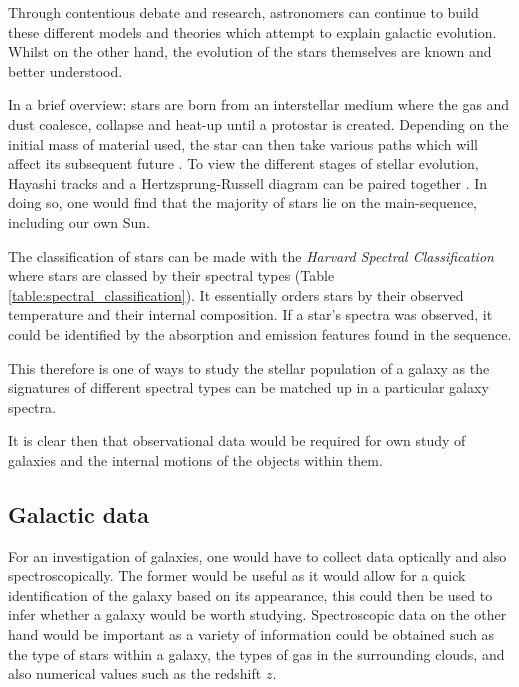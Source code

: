 \documentclass[12pt, twocolumn]{revtex4-1}    %
\begin{document}
Through contentious debate and research, astronomers can continue to build these different models and theories which attempt to explain galactic evolution. Whilst on the other hand, the evolution of the stars themselves are known and better understood. 

In a brief overview: stars are born from an interstellar medium where the gas and dust coalesce, collapse and heat-up until a protostar is created. Depending on the initial mass of material used, the star can then take various paths which will affect its subsequent future \citep{mccoy_space_sciences}. To view the different stages of stellar evolution, Hayashi tracks and a Hertzsprung-Russell diagram can be paired together \citep{carroll_astro}. In doing so, one would find that the majority of stars lie on the main-sequence, including our own Sun.  


The classification of stars can be made with the \textit{Harvard Spectral Classification} where stars are classed by their spectral types (Table \ref{table:spectral_classification}). It essentially orders stars by their observed temperature and their internal composition. If a star's spectra was observed, it could be identified by the absorption and emission features found in the sequence.   

This therefore is one of ways to study the stellar population of a galaxy as the signatures of different spectral types can be matched up in a particular galaxy spectra. 

It is clear then that observational data would be required for own study of galaxies and the internal motions of the objects within them. 

\subsection{Galactic data} 

For an investigation of galaxies, one would have to collect data optically and also spectroscopically. The former would be useful as it would allow for a quick identification of the galaxy based on its appearance, this could then be used to infer whether a galaxy would be worth studying. Spectroscopic data on the other hand would be important as a variety of information could be obtained such as the type of stars within a galaxy, the types of gas in the surrounding clouds, and also numerical values such as the redshift $z$. 
\end{document}
